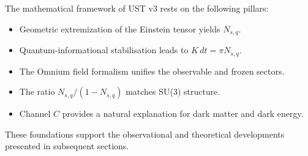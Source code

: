 The mathematical framework of UST v3 rests on the following pillars:
\begin{itemize}
\item Geometric extremization of the Einstein tensor yields $N_{s,q}$.
\item Quantum-informational stabilisation leads to $K\,dt = \pi N_{s,q}$.
\item The Omnium field formalism unifies the observable and frozen sectors.
\item The ratio $N_{s,q}/(1-N_{s,q})$ matches SU(3) structure.
\item Channel $C$ provides a natural explanation for dark matter and dark energy.
\end{itemize}

These foundations support the observational and theoretical developments
presented in subsequent sections.